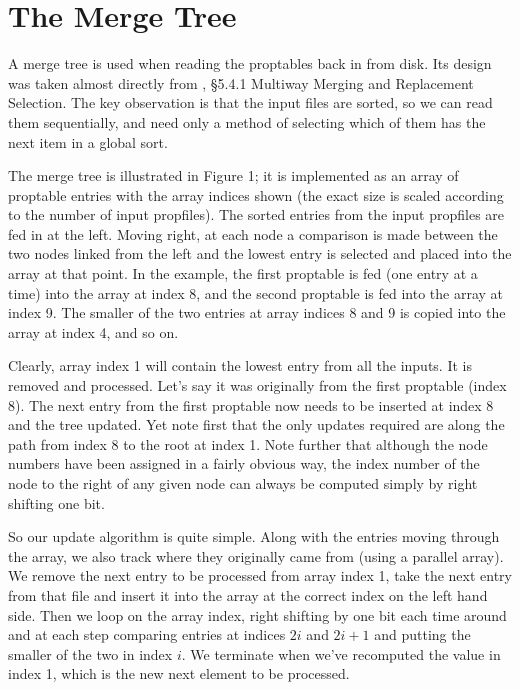 \documentclass[11pt]{article}
\begin{document}
\section{The Merge Tree}

A merge tree is used when reading the proptables back in from disk.
Its design was taken almost directly from \cite{knuth}, \S5.4.1
Multiway Merging and Replacement Selection.  The key observation is
that the input files are sorted, so we can read them sequentially, and
need only a method of selecting which of them has the next item in a
global sort.

The merge tree is illustrated in Figure 1; it is implemented as an
array of proptable entries with the array indices shown (the exact
size is scaled according to the number of input propfiles).  The
sorted entries from the input propfiles are fed in at the left.
Moving right, at each node a comparison is made between the two nodes
linked from the left and the lowest entry is selected and placed into
the array at that point.  In the example, the first proptable is fed
(one entry at a time) into the array at index 8, and the second
proptable is fed into the array at index 9.  The smaller of the two
entries at array indices 8 and 9 is copied into the array at index 4,
and so on.

Clearly, array index 1 will contain the lowest entry from all the
inputs.  It is removed and processed.  Let's say it was originally
from the first proptable (index 8).  The next entry from the first
proptable now needs to be inserted at index 8 and the tree updated.
Yet note first that the only updates required are along the path from
index 8 to the root at index 1.  Note further that although the node
numbers have been assigned in a fairly obvious way, the index number
of the node to the right of any given node can always be computed
simply by right shifting one bit.

So our update algorithm is quite simple.  Along with the entries
moving through the array, we also track where they originally came
from (using a parallel array).  We remove the next entry to be
processed from array index 1, take the next entry from that file and
insert it into the array at the correct index on the left hand side.
Then we loop on the array index, right shifting by one bit each time
around and at each step comparing entries at indices $2i$ and $2i+1$
and putting the smaller of the two in index $i$.  We terminate when
we've recomputed the value in index 1, which is the new next element
to be processed.
\end{document}
